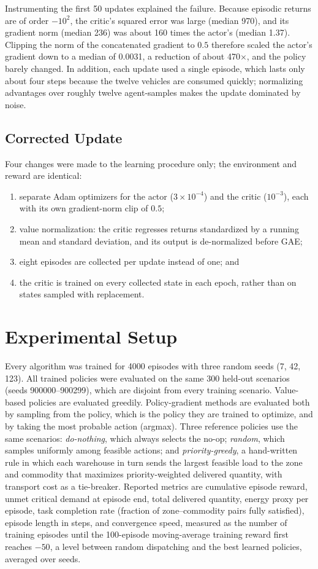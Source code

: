 \documentclass[conference]{IEEEtran}
\begin{document}
Instrumenting the first 50 updates explained the failure. Because episodic returns are of order $-10^{2}$, the critic's squared error was large (median 970), and its gradient norm (median 236) was about 160 times the actor's (median 1.37). Clipping the norm of the concatenated gradient to $0.5$ therefore scaled the actor's gradient down to a median of 0.0031, a reduction of about 470$\times$, and the policy barely changed. In addition, each update used a single episode, which lasts only about four steps because the twelve vehicles are consumed quickly; normalizing advantages over roughly twelve agent-samples makes the update dominated by noise.

\subsection{Corrected Update}
\label{sec:fix}
Four changes were made to the learning procedure only; the environment and reward are identical:
\begin{enumerate}
\item separate Adam optimizers for the actor ($3\times10^{-4}$) and the critic ($10^{-3}$), each with its own gradient-norm clip of $0.5$;
\item value normalization: the critic regresses returns standardized by a running mean and standard deviation, and its output is de-normalized before GAE;
\item eight episodes are collected per update instead of one; and
\item the critic is trained on every collected state in each epoch, rather than on states sampled with replacement.
\end{enumerate}

\section{Experimental Setup}
Every algorithm was trained for 4000 episodes with three random seeds (7, 42, 123). All trained policies were evaluated on the same 300 held-out scenarios (seeds 900000--900299), which are disjoint from every training scenario. Value-based policies are evaluated greedily. Policy-gradient methods are evaluated both by sampling from the policy, which is the policy they are trained to optimize, and by taking the most probable action (argmax). Three reference policies use the same scenarios: \emph{do-nothing}, which always selects the no-op; \emph{random}, which samples uniformly among feasible actions; and \emph{priority-greedy}, a hand-written rule in which each warehouse in turn sends the largest feasible load to the zone and commodity that maximizes priority-weighted delivered quantity, with transport cost as a tie-breaker. Reported metrics are cumulative episode reward, unmet critical demand at episode end, total delivered quantity, energy proxy per episode, task completion rate (fraction of zone--commodity pairs fully satisfied), episode length in steps, and convergence speed, measured as the number of training episodes until the 100-episode moving-average training reward first reaches $-50$, a level between random dispatching and the best learned policies, averaged over seeds.
\end{document}
